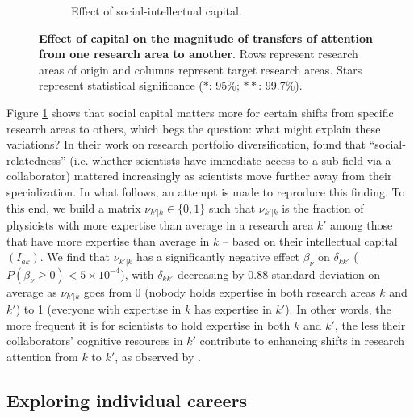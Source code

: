 \documentclass{article}
\begin{document}
\begin{figure}[h]
\begin{subfigure}{.5\textwidth}
    \caption{Effect of social-intellectual capital.}
    \label{fig:social-capital-effect}
\end{subfigure}
\caption{\textbf{Effect of capital on the magnitude of transfers of attention from one research area to another}. Rows represent research areas of origin and columns represent target research areas. Stars represent statistical significance ($\ast$: 95\%; $\ast\ast$: 99.7\%).}
\label{fig:test}
\end{figure}

Figure \ref{fig:social-capital-effect} shows that social capital matters more for certain shifts from specific research areas to others, which begs the question: what might explain these variations? In their work on research portfolio diversification, \citet{Tripodi2020} found that ``social-relatedness'' (i.e. whether scientists have immediate access to a sub-field via a collaborator) mattered increasingly as scientists move further away from their specialization. In what follows, an attempt is made to reproduce this finding. To this end, we build a matrix $\nu_{k'|k}\in\{0,1\}$ such that $\nu_{k'|k}$ is the fraction of physicists with more expertise than average in a research area $k'$ among those that have more expertise than average in $k$ -- based on their intellectual capital $(I_{ak})$. We find that $\nu_{k'|k}$ has a significantly negative effect $\beta_\nu$ on $\delta_{kk'}$ ($P(\beta_\nu\geq 0)<5\times 10^{-4}$), with $\delta_{kk'}$ decreasing by 0.88 standard deviation on average as $\nu_{k'|k}$ goes from 0 (nobody holds expertise in both research areas $k$ and $k'$) to 1 (everyone with expertise in $k$ has expertise in $k'$). In other words, the more frequent it is for scientists to hold expertise in both $k$ and $k'$, the less their collaborators' cognitive resources in $k'$ contribute to enhancing shifts in research attention from $k$ to $k'$, as observed by \citet{Tripodi2020}.



\subsection{\label{sec:cases}Exploring individual careers}
\end{document}
